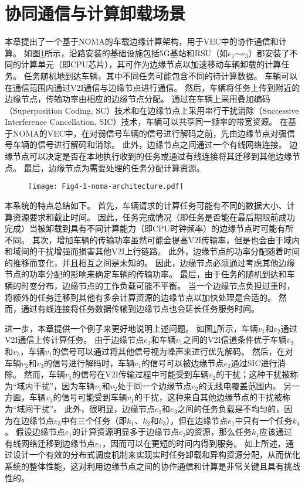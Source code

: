 \section{协同通信与计算卸载场景}\label{section 4-2}

本章提出了一个基于NOMA的车载边缘计算架构，用于VEC中的协作通信和计算。
如图\ref{fig 4-1}所示，沿路安装的基础设施包括5G基站和RSU（如$e_1$$\sim$$e_3$）都安装了不同的计算单元（即CPU芯片），其可作为边缘节点以加速移动车辆卸载的计算任务。
任务随机地到达车辆，其中不同任务可能包含不同的待计算数据。
车辆可以在通信范围内通过V2I通信与边缘节点进行通信。
然后，车辆将任务上传到附近的边缘节点，传输功率由相应的边缘节点分配。
通过在车辆上采用叠加编码（Superposition Coding, SC）技术和在边缘节点上采用串行干扰消除（Successive Interference Cancellation, SIC）\cite{khan2021noma}技术，车辆可以共享同一频率的带宽资源。
在基于NOMA的VEC中，在对弱信号车辆的信号进行解码之前，先由边缘节点对强信号车辆的信号进行解码和消除。
此外，边缘节点之间通过一个有线网络连接。
边缘节点可以决定是否在本地执行收到的任务或通过有线连接将其迁移到其他边缘节点。
最后，边缘节点为需要处理的任务分配计算资源。

\begin{figure}[h]
\centering
  \texttt{[image: Fig4-1-noma-architecture.pdf]}
  \label{fig 4-1}
\end{figure} 

本系统的特点总结如下。
首先，车辆请求的计算任务可能有不同的数据大小、计算资源要求和截止时间。
因此，任务完成情况（即任务是否能在最后期限前成功完成）当被卸载到具有不同计算能力（即CPU时钟频率）的边缘节点时可能有所不同。
其次，增加车辆的传输功率虽然可能会提高V2I传输率，但是也会由于域内和域间的干扰增强而损害其他V2I上行链路。
此外，边缘节点的功率分配随着时间的推移而变化，并且相互之间是未知的。
因此，边缘节点必须通过考虑其他边缘节点的功率分配的影响来确定车辆的传输功率。
最后，由于任务的随机到达和车辆的时变分布，边缘节点的工作负载可能不平衡。
当一个边缘节点负担过重时，将额外的任务迁移到其他有多余计算资源的边缘节点以加快处理是合适的。
然而，通过有线连接将任务数据传输到边缘节点也会延长任务服务时间。

进一步，本章提供一个例子来更好地说明上述问题。
如图\ref{fig 4-1}所示，车辆$v_1$和$v_2$通过V2I通信上传计算任务。
由于边缘节点$e_2$和车辆$v_1$之间的V2I信道条件优于车辆$v_2$和$v_3$，车辆$v_1$的信号可以通过将其他信号视为噪声来进行优先解码。
然后，在对车辆$v_2$和$v_3$的信号进行解码时，车辆$v_1$的信号可以被边缘节点$e_2$通过SIC进行消除。
然而，车辆$v_1$的信号在V2I传输过程中可能受到车辆$v_2$的干扰；这种干扰被称为“域内干扰”，因为车辆$v_1$和$v_2$处于同一个边缘节点$e_2$的无线电覆盖范围内。
另一方面，车辆$v_3$的信号可能受到车辆$v_1$的干扰，这种来自其他边缘节点的干扰被称为“域间干扰”。
此外，很明显，边缘节点$e_1$和$e_3$之间的任务负载是不均匀的，因为在边缘节点$e_3$中有三个任务（即$k_1$、$k_2$和$k_3$），但在边缘节点$e_1$中只有一个任务$k_4$。
假设边缘节点$e_1$的计算资源明显多于边缘节点$e_3$的资源，那么任务$k_1$应该通过有线网络迁移到边缘节点$e_1$，因而可以在更短的时间内得到服务。
如上所述，通过设计一个有效的分布式调度机制来实现实时任务卸载和异构资源分配，从而优化系统的整体性能，这对利用边缘节点之间的协作通信和计算是非常关键且具有挑战性的。

